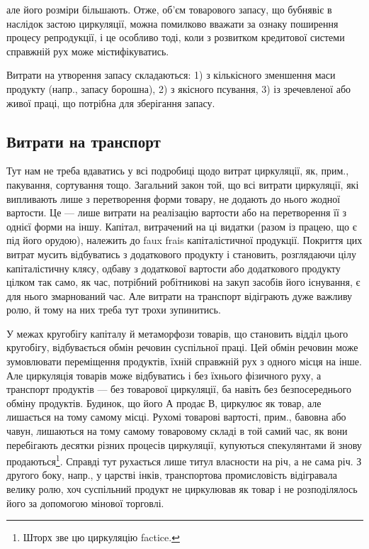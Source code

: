 \parcont{}  %
але його розміри більшають. Отже, об’єм товарового запасу, що
бубнявіє в наслідок застою циркуляції, можна помилково вважати за
ознаку поширення процесу репродукції, і це особливо тоді, коли з розвитком
кредитової системи справжній рух може містифікуватись.

Витрати на утворення запасу складаються: 1) з кількісного зменшення
маси продукту (напр., запасу борошна), 2) з якісного псування, 3) із зречевленої
або живої праці, що потрібна для зберігання запасу.

\subsection{Витрати на транспорт}

Тут нам не треба вдаватись у всі подробиці щодо витрат циркуляції,
як, прим., пакування, сортування тощо. Загальний закон той, що всі
витрати циркуляції, які випливають лише з перетворення
форми товару, не додають до нього жодної
вартости. Це — лише витрати на реалізацію вартости або на перетворення
її з однієї форми на іншу. Капітал, витрачений на ці видатки
(разом із працею, що є під його орудою), належить до faux frais капіталістичної
продукції. Покриття цих витрат мусить відбуватись з додаткового
продукту і становить, розглядаючи цілу капіталістичну клясу, одбаву
з додаткової вартости або додаткового продукту цілком так само,
як час, потрібний робітникові на закуп засобів його існування, є для нього
змарнований час. Але витрати на транспорт відіграють дуже важливу
ролю, й тому на них треба тут трохи зупинитись.

У межах кругобігу капіталу й метаморфози товарів, що становить
відділ цього кругобігу, відбувається обмін речовин суспільної праці. Цей
обмін речовин може зумовлювати переміщення продуктів, їхній справжній
рух з одного місця на інше. Але циркуляція товарів може відбуватись і
без їхнього фізичного руху, а транспорт продуктів — без товарової циркуляції,
ба навіть без безпосереднього обміну продуктів. Будинок, що
його А продає В, циркулює як товар, але лишається на тому самому
місці. Рухомі товарові вартості, прим., бавовна або чавун, лишаються
на тому самому товаровому складі в той самий час, як вони перебігають
десятки різних процесів циркуляції, купуються спекулянтами й знову
продаються\footnote{
Шторх зве цю циркуляцію factice.
}. Справді тут рухається лише титул власности на річ, а не
сама річ. З другого боку, напр., у царстві інків, транспортова промисловість
відігравала велику ролю, хоч суспільний продукт не циркулював як
товар і не розподілялось його за допомогою мінової торговлі.

